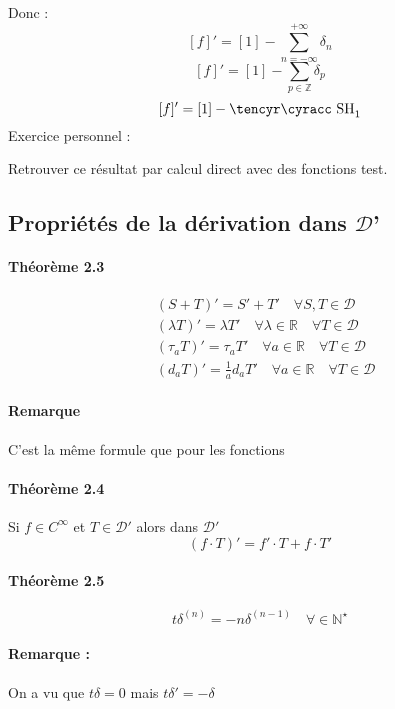 \documentclass[12pt,a4paper]{report}
\newcommand{\ens}[1]{\ensuremath{\mathbb{#1}}}
\newcommand{\D}{\ensuremath{\mathcal{D}}}
\def\cyr{\tencyr\cyracc}
\def\dc{\mbox{\cyr SH}}
\begin{document}
Donc :
\[
	[f]' = [1] - \sum_{n = -\infty}^{+\infty} \delta_n 
\]
\[
	[f]' = [1] - \sum_{p \in \ens{Z}} \delta_p
\]
\[
	[f]' = [1] - \dc_1
\]
Exercice personnel :

Retrouver ce résultat par calcul direct avec des fonctions test.

\subsection{Propriétés de la dérivation dans \D'}

\paragraph{Théorème 2.3}

\begin{align*}
	&(S+T)' = S'+T' \quad	\forall S,T \in \D\\
	&(\lambda T)' = \lambda T' \quad \forall \lambda \in \ens{R} \quad	\forall T \in \D\\
	&(\tau_a T)' = \tau_a T' \quad \forall a \in \ens{R} \quad	\forall T \in \D\\
	&(d_a T)' = \frac{1}{a}d_aT' \quad \forall a \in \ens{R} \quad	\forall T \in \D
\end{align*}

\paragraph{Remarque} \quad

C'est la même formule que pour les fonctions

\paragraph{Théorème 2.4} Si \(f \in C^{\infty}\) et \(T \in \D'\) alors dans \(\D'\)
\[
	(f\cdot T)' = f' \cdot T + f \cdot T'
\]

\paragraph{Théorème 2.5}

\[
	t\delta^{(n)} = -n \delta^{(n-1)} \quad \forall \in \ens{N^\star} 
\]

\paragraph{Remarque :} On a vu que \(t\delta = 0\) mais \(t\delta' = -\delta\)
\end{document}
